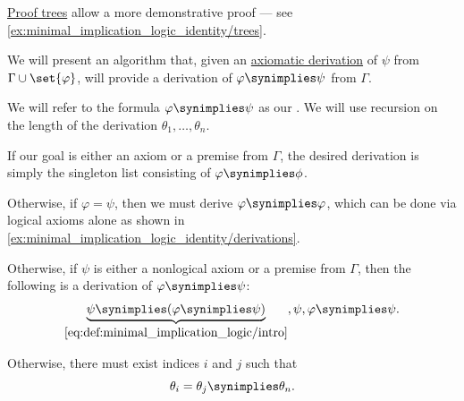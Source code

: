 \begin{comments}
  \item \hyperref[def:proof_tree]{Proof trees} allow a more demonstrative proof --- see \eqref{ex:minimal_implication_logic_identity/trees}.
\end{comments}

\begin{algorithm}\label{alg:derivation_conclusion_hypothesis_introduction}
  We will present an algorithm that, given an \hyperref[def:propositional_axiomatic_derivation]{axiomatic derivation} of \( \psi \) from \( \Gamma \cup \set{ \varphi } \), will provide a derivation of \( \varphi \synimplies \psi \) from \( \Gamma \).

  We will refer to the formula \( \varphi \synimplies \psi \) as our . We will use recursion on the length of the derivation \( \theta_1, \ldots, \theta_n \).

  \begin{thmenum}
     If our goal is either an axiom or a premise from \( \Gamma \), the desired derivation is simply the singleton list consisting of \( \varphi \synimplies \phi \).

     Otherwise, if \( \varphi = \psi \), then we must derive \( \varphi \synimplies \varphi \), which can be done via logical axioms alone as shown in \cref{ex:minimal_implication_logic_identity/derivations}.

     Otherwise, if \( \psi \) is either a nonlogical axiom or a premise from \( \Gamma \), then the following is a derivation of \( \varphi \synimplies \psi \):
    \begin{equation*}
      \underbrace{\psi \synimplies (\varphi \synimplies \psi)}_{\eqref{eq:def:minimal_implication_logic/intro}},
      \psi,
      \varphi \synimplies \psi.
    \end{equation*}

     Otherwise, there must exist indices \( i \) and \( j \) such that
    \begin{equation*}
      \theta_i = \theta_j \synimplies \theta_n.
    \end{equation*}


\end{thmenum}
\end{algorithm}
